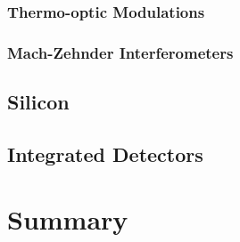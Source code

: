 \subsubsection*{Thermo-optic Modulations}

\subsubsection*{Mach-Zehnder Interferometers}

\subsection{Silicon}

\subsection{Integrated Detectors}

\section{Summary}


